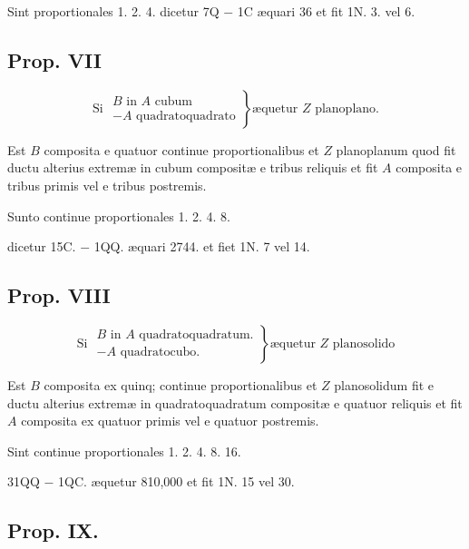 \documentclass[11pt,a4paper]{article}
\begin{document}
Sint proportionales 1. 2. 4. dicetur 7Q $-$ 1C æquari 36 et fit 1N. 3. vel 6.

\subsection*{Prop. VII}

\[ \text{Si } \left.\begin{array}{l} B \text{ in } A \text{ cubum} \\ - A \text{ quadratoquadrato} \end{array}\right\} \text{æquetur } Z \text{ planoplano.} \]

Est $B$ composita e quatuor continue proportionalibus et $Z$ planoplanum quod fit ductu alterius extremæ in cubum compositæ e tribus reliquis et fit $A$ composita e tribus primis vel e tribus postremis.

Sunto continue proportionales 1. 2. 4. 8.

dicetur 15C. $-$ 1QQ. æquari 2744. et fiet 1N. 7 vel 14.

\subsection*{Prop. VIII}

\[ \text{Si } \left.\begin{array}{l} B \text{ in } A \text{ quadratoquadratum.} \\ - A \text{ quadratocubo.} \end{array}\right\} \text{æquetur } Z \text{ planosolido} \]

Est $B$ composita ex quinq; continue proportionalibus et $Z$ planosolidum fit e ductu alterius extremæ in quadratoquadratum compositæ e quatuor reliquis et fit $A$ composita ex quatuor primis vel e quatuor postremis.

Sint continue proportionales 1. 2. 4. 8. 16.

31QQ $-$ 1QC. æquetur 810,000 et fit 1N. 15 vel 30.

\subsection*{Prop. IX.}
\end{document}
